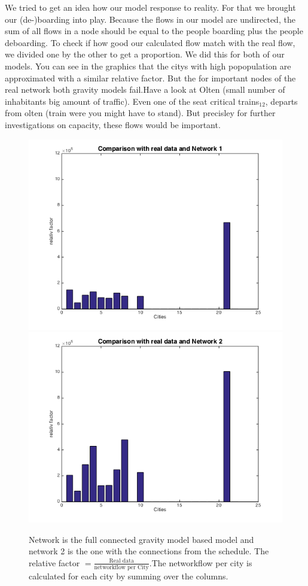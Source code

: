 \documentclass[11pt]{article}
\begin{document}
We tried to get an idea how our model response to reality. For that we brought our (de-)boarding into play. Because the flows in our model are undirected, the sum of all flows in a node should be equal to the people boarding plus the people deboarding. To check if how good our calculated flow match with the real flow, we divided one by the other to get a proportion. We did this for both of our models. You can see in the graphics that the citys with high popopulation are approximated with a similar relative factor. But the for important nodes of the real network both gravity models fail.Have a look at Olten (small number of inhabitants big amount of traffic). Even one of the seat critical trains$_{12}$, departs from olten (train were you might have to stand). But precisley for further investigations on capacity, these flows would be important.


\begin{figure}[h]
\includegraphics[scale=0.4]{compare1}
\includegraphics[scale=0.4]{compare2}
 \caption{Network is the full connected gravity model based model and network 2 is the one with the connections from the schedule. The relative factor $=\frac{\text{Real data}}{\text{networkflow per City}}$.The networkflow per city is calculated for each city by summing over the columns.}
\end{figure}
\end{document}
